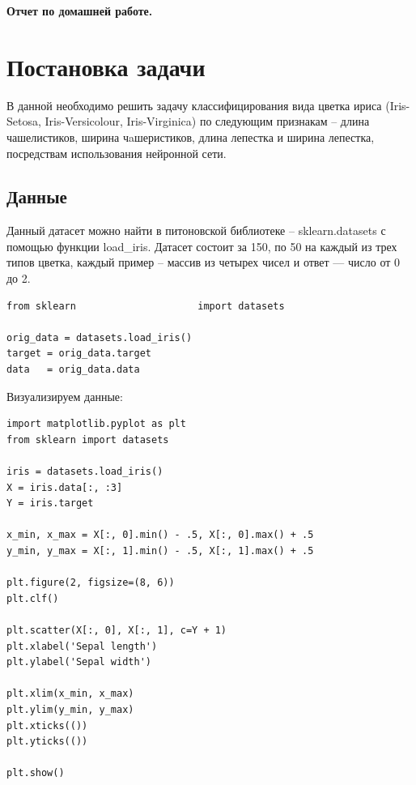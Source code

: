 \documentclass[12pt,reqno]{amsart}
\theoremstyle{definition}
\theoremstyle{remark}
\begin{document}
\begin{center}
\Large{\bf Отчет по домашней работе.}

\end{center}

\section{Постановка задачи}


В данной необходимо решить задачу классифицирования вида цветка ириса (Iris-Setosa, Iris-Versicolour, Iris-Virginica) по следующим признакам -- длина чашелистиков, ширина чaшеристиков, длина лепестка и ширина лепестка, посредствам использования нейронной сети.

\subsection{Данные}


Данный датасет можно найти в питоновской библиотеке -- sklearn.datasets с помощью функции load\_iris. Датасет состоит за 150, по 50 на каждый из трех типов цветка, каждый пример -- массив из четырех чисел и ответ — число от 0 до 2.

\begin{lstlisting}
from sklearn                     import datasets

orig_data = datasets.load_iris()
target = orig_data.target
data   = orig_data.data
\end{lstlisting}

Визуализируем данные:

\begin{lstlisting}
import matplotlib.pyplot as plt
from sklearn import datasets

iris = datasets.load_iris()
X = iris.data[:, :3]
Y = iris.target

x_min, x_max = X[:, 0].min() - .5, X[:, 0].max() + .5
y_min, y_max = X[:, 1].min() - .5, X[:, 1].max() + .5

plt.figure(2, figsize=(8, 6))
plt.clf()

plt.scatter(X[:, 0], X[:, 1], c=Y + 1)
plt.xlabel('Sepal length')
plt.ylabel('Sepal width')

plt.xlim(x_min, x_max)
plt.ylim(y_min, y_max)
plt.xticks(())
plt.yticks(())

plt.show()
\end{lstlisting}
\end{document}
